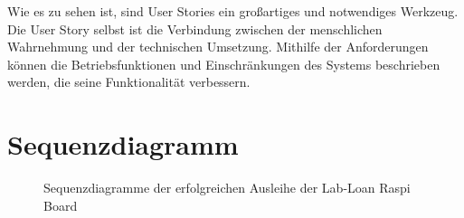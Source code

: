 Wie es zu sehen ist, sind User Stories ein großartiges und notwendiges Werkzeug. Die User Story selbst ist die Verbindung zwischen der menschlichen Wahrnehmung und der technischen Umsetzung. Mithilfe der Anforderungen können die Betriebsfunktionen und Einschränkungen des Systems beschrieben werden, die seine Funktionalität verbessern.

\section{Sequenzdiagramm}
\label{sec:design:sequenz}
\begin{figure}
	\centering
	\caption{Sequenzdiagramme der erfolgreichen Ausleihe der Lab-Loan Raspi Board}
	\label{fig:seq}
\end{figure}
